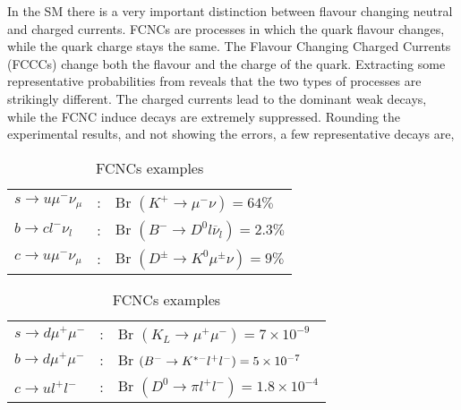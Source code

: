 In the SM there is a very important distinction between flavour changing neutral and charged currents.  FCNCs are processes in which the quark flavour changes, while the quark charge stays the same. 
%
The Flavour Changing Charged Currents (FCCCs) change both the flavour and the charge of the quark. 
%
Extracting some representative probabilities from \cite{Tanabashi:2018oca} reveals that the two types of processes are strikingly different.  
%
The charged currents lead to the dominant weak decays, while the FCNC induce decays  are extremely suppressed. Rounding the experimental results, and not showing the errors, a few representative decays are, 
%
\setlength{\tabcolsep}{2pt} %
\renewcommand{\arraystretch}{1} %
%
\begin{table}[!htb]
    \begin{minipage}{.5\linewidth}
      \caption{FCCCs examples}
\centering
\begin{tabular}{lcl}
$s \rightarrow u \mu^- \nu_\mu $ & : & Br $\left( K^+ \rightarrow \mu^- \nu\right) = 64 \%$                 \\
$b \rightarrow c l^- \nu_l $       & : & Br $\left( B^- \rightarrow D^0 l \overline{\nu}_l \right) = 2.3 \% $ \\
$c \rightarrow u \mu^- \nu_\mu $   & : & Br $\left( D^\pm \rightarrow K^0 \mu^\pm \nu \right) = 9 \%$        
\end{tabular}
    \end{minipage}%
    \begin{minipage}{.5\linewidth}
      \centering
        \caption{FCNCs examples}
\begin{tabular}{lcl}
$s \rightarrow d \mu^+ \mu^- $ & : & Br $\left( K_L \rightarrow\mu^+ \mu^- \right) =  7\times10^{-9}$        \\
$ b \rightarrow d \mu^+ \mu^-$ & : & Br $\left( B^- \rightarrow  K^{\** -} l^+ l^- \right) =  5\times10^{-7}$ \\
$ c \rightarrow u l^+ l^-$     & : & Br $\left( D^0 \rightarrow \pi l^+ l^- \right) =  1.8\times10^{-4}$      
\end{tabular}
    \end{minipage} 
\end{table}

\setlength{\tabcolsep}{6pt} %
\renewcommand{\arraystretch}{1} %

